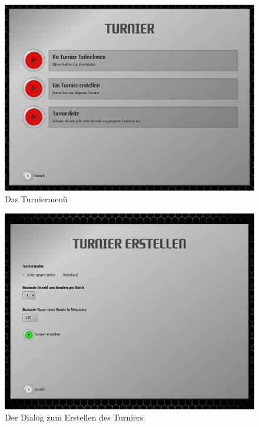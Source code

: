 \begin{figure}
  \centering
  \label{tournament-menu}
  \includegraphics[width=15cm, keepaspectratio]{figures/5-turniermenu.png}
  \caption{Das Turniermenü}
\end{figure}

\begin{figure}
  \centering
  \label{create-tournament}
  \includegraphics[width=15cm, keepaspectratio]{figures/6-turnier-erstellen-jgj.png}
  \caption{Der Dialog zum Erstellen des Turniers}
\end{figure}

